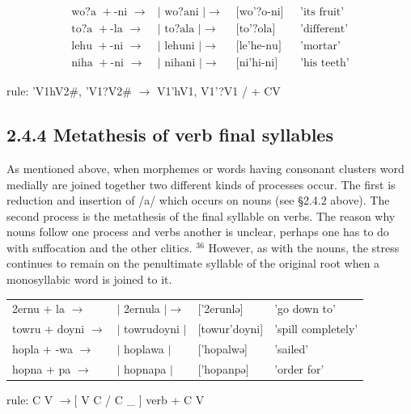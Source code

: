\documentclass[10pt]{article}
\begin{document}
\[
\begin{array}{llll}
\text { wo?a }+ \text {-ni } \rightarrow & \mid \text { wo?ani } \mid \rightarrow & \text { [wo'?o-ni] } & \text { 'its fruit' } \\
\text { to?a }+ \text {-la } \rightarrow & \mid \text { to?ala } \mid \rightarrow & \text { [to'?ola] } & \text { 'different' } \\
\text { lehu }+ \text {-ni } \rightarrow & \mid \text { lehuni } \mid \rightarrow & \text { [le'he-nu] } & \text { 'mortar' } \\
\text { niha }+ \text {-ni } \rightarrow & \mid \text { nihani } \mid \rightarrow & \text { [ni'hi-ni] } & \text { 'his teeth' }
\end{array}
\]

rule: 'V1hV2\#, 'V1?V2\# \(\rightarrow\) V1'hV1, V1'?V1 / + CV

\subsection*{2.4.4 Metathesis of verb final syllables}
As mentioned above, when morphemes or words having consonant clusters word medially are joined together two different kinds of processes occur. The first is reduction and insertion of /a/ which occurs on nouns (see §2.4.2 above). The second process is the metathesis of the final syllable on verbs. The reason why nouns follow one process and verbs another is unclear, perhaps one has to do with suffocation and the other clitics. \({ }^{36}\) However, as with the nouns, the stress continues to remain on the penultimate syllable of the original root when a monosyllabic word is joined to it.

\begin{center}
\begin{tabular}{llll}
2ernu + la \(\rightarrow\) & \(\mid\) 2ernula \(\mid \rightarrow\) & ['2erunlə] & 'go down to' \\
towru + doyni \(\rightarrow\) & \(\mid\) towrudoyni \(\mid\) & [towur'doyni] & 'spill completely' \\
hopla + -wa \(\rightarrow\) & \(\mid\) hoplawa \(\mid\) & ['hopalwə] & 'sailed' \\
hopna + pa \(\rightarrow\) & \(\mid\) hopnapa \(\mid\) & ['hopanpə] & 'order for' \\
\end{tabular}
\end{center}

rule: C V \(\rightarrow[\) V C / C \_ ] verb + C V
\end{document}
